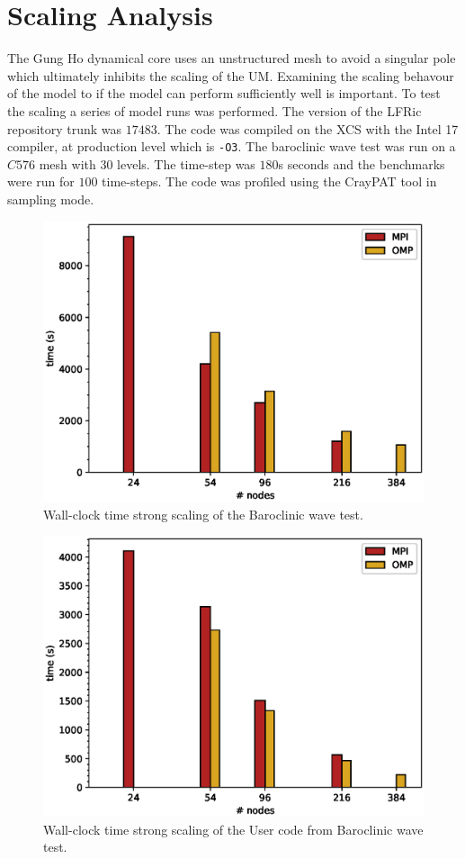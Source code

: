 \section{\label{sec:scale}Scaling Analysis}
The Gung Ho dynamical core uses an unstructured mesh to avoid a
singular pole which ultimately inhibits the scaling of the
UM. Examining the scaling behavour of the model to if the model can
perform sufficiently well is important. To test the scaling a series
of model runs was performed. The version of the LFRic repository trunk
was $17483$. The code was compiled on the XCS with the Intel 17
compiler, at production level which is \verb+-O3+. The baroclinic wave
test was run on a $C576$ mesh with 30 levels. The time-step was $180$s
seconds and the benchmarks were run for $100$ time-steps. The code was
profiled using the CrayPAT tool in sampling mode. 

\begin{figure}
\centering\includegraphics[width=1.0\linewidth]{figs/wc-scale.eps}
\caption{\label{fig:wc_scale}Wall-clock time strong scaling of the 
  Baroclinic wave test.}
\end{figure} 

\begin{figure}
\centering\includegraphics[width=1.0\linewidth]{figs/U-scale.eps}
\caption{\label{fig:U_scale}Wall-clock time strong scaling of the 
  User code from Baroclinic wave test.}
\end{figure} 

